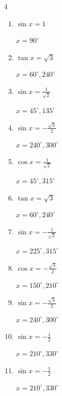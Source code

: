 \begin{multicols}{4}
\begin{enumerate}
        $\displaystyle x = 90^{\circ}$

  \item $\displaystyle \sin{x}  = 1$

        $\displaystyle x = 90^{\circ}$

  \item $\displaystyle \tan{x}  = \sqrt{3}$

        $\displaystyle x = 60^{\circ} , 240^{\circ}$

  \item $\displaystyle \sin{x}  = \frac{1}{\sqrt{2}}$

        $\displaystyle x = 45^{\circ} , 135^{\circ}$

  \item $\displaystyle \sin{x}  = -\frac{\sqrt{3}}{2}$

        $\displaystyle x = 240^{\circ} , 300^{\circ}$

  \item $\displaystyle \cos{x}  = \frac{1}{\sqrt{2}}$

        $\displaystyle x = 45^{\circ} , 315^{\circ}$

  \item $\displaystyle \tan{x}  = \sqrt{3}$

        $\displaystyle x = 60^{\circ} , 240^{\circ}$

  \item $\displaystyle \sin{x}  = -\frac{1}{\sqrt{2}}$

        $\displaystyle x = 225^{\circ} , 315^{\circ}$

  \item $\displaystyle \cos{x}  = -\frac{\sqrt{3}}{2}$

        $\displaystyle x = 150^{\circ} , 210^{\circ}$

  \item $\displaystyle \sin{x}  = -\frac{\sqrt{3}}{2}$

        $\displaystyle x = 240^{\circ} , 300^{\circ}$

  \item $\displaystyle \sin{x}  = -\frac{1}{2}$

        $\displaystyle x = 210^{\circ} , 330^{\circ}$

\columnbreak %

  \item $\displaystyle \sin{x}  = -\frac{1}{2}$

        $\displaystyle x = 210^{\circ} , 330^{\circ}$


\end{enumerate}
\end{multicols}
